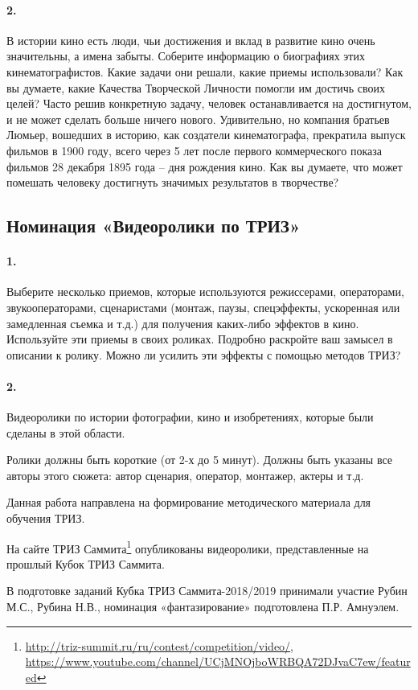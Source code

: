 \documentclass[11pt,a4paper]{article}
\newcommand{\video}{Ролики должны быть короткие (от 2-х до 5 минут). Должны
  быть указаны все авторы этого сюжета: автор сценария, оператор, монтажер,
  актеры и т.д.

Данная работа направлена на формирование методического материала для обучения
ТРИЗ.

На сайте ТРИЗ
Саммита\footnote{\url{http://triz-summit.ru/ru/contest/competition/video/},\\
  \url{https://www.youtube.com/channel/UCjMNOjboWRBQA72DJvaC7ew/featured}}
опубликованы видеоролики, представленные на прошлый Кубок ТРИЗ Саммита.}
\newcommand{\credentials}{В подготовке заданий Кубка ТРИЗ Саммита-2018/2019
  принимали участие Рубин М.С., Рубина Н.В., номинация «фантазирование»
  подготовлена П.Р. Амнуэлем.}
\begin{document}
\paragraph{2.}
В истории кино есть люди, чьи достижения и вклад в развитие кино очень
значительны, а имена забыты. Соберите информацию о биографиях этих
кинематографистов. Какие задачи они решали, какие приемы использовали? Как вы
думаете, какие Качества Творческой Личности помогли им достичь своих целей?
Часто решив конкретную задачу, человек останавливается на достигнутом, и не
может сделать больше ничего нового. Удивительно, но компания братьев Люмьер,
вошедших в историю, как создатели кинематографа, прекратила выпуск фильмов в
1900 году, всего через 5 лет после первого коммерческого показа фильмов 28
декабря 1895 года – дня рождения кино. Как вы думаете, что может помешать
человеку достигнуть значимых результатов в творчестве?

\subsection*{Номинация «Видеоролики по ТРИЗ»}

\paragraph{1.}
Выберите несколько приемов, которые используются режиссерами, операторами,
звукооператорами, сценаристами (монтаж, паузы, спецэффекты, ускоренная или
замедленная съемка и т.д.) для получения каких-либо эффектов в
кино. Используйте эти приемы в своих роликах. Подробно раскройте ваш замысел в
описании к ролику. Можно ли усилить эти эффекты с помощью методов ТРИЗ?

\paragraph{2.}
Видеоролики по истории фотографии, кино и изобретениях, которые были сделаны в
этой области.

\video\par\credentials
\end{document}
